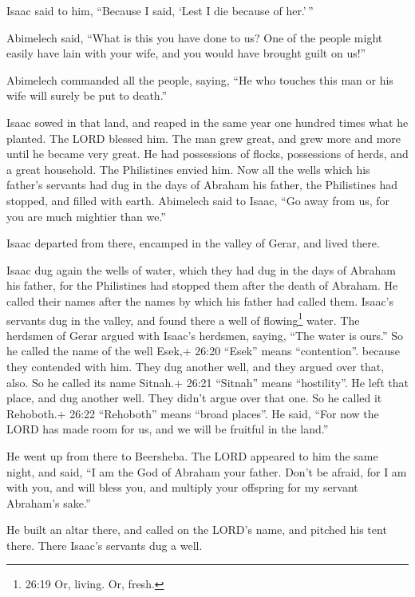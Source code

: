 Isaac said to him, ``Because I said, `Lest I die because of her.'\,''

 Abimelech said, ``What is this you have done to us? One of
the people might easily have lain with your wife, and you would have
brought guilt on us!''

 Abimelech commanded all the people, saying, ``He who
touches this man or his wife will surely be put to death.''

 Isaac sowed in that land, and reaped in the same year one
hundred times what he planted. The LORD blessed him.  The
man grew great, and grew more and more until he became very great.
 He had possessions of flocks, possessions of herds, and a
great household. The Philistines envied him.  Now all the
wells which his father's servants had dug in the days of Abraham his
father, the Philistines had stopped, and filled with earth.
 Abimelech said to Isaac, ``Go away from us, for you are
much mightier than we.''

 Isaac departed from there, encamped in the valley of
Gerar, and lived there.

 Isaac dug again the wells of water, which they had dug in
the days of Abraham his father, for the Philistines had stopped them
after the death of Abraham. He called their names after the names by
which his father had called them.  Isaac's servants dug in
the valley, and found there a well of flowing\footnote{26:19 Or, living.
  Or, fresh.} water.  The herdsmen of Gerar argued with
Isaac's herdsmen, saying, ``The water is ours.'' So he called the name
of the well Esek,+ 26:20 ``Esek'' means ``contention''. because they
contended with him.  They dug another well, and they argued
over that, also. So he called its name Sitnah.+ 26:21 ``Sitnah'' means
``hostility''.  He left that place, and dug another well.
They didn't argue over that one. So he called it Rehoboth.+ 26:22
``Rehoboth'' means ``broad places''. He said, ``For now the LORD has
made room for us, and we will be fruitful in the land.''

 He went up from there to Beersheba.  The LORD
appeared to him the same night, and said, ``I am the God of Abraham your
father. Don't be afraid, for I am with you, and will bless you, and
multiply your offspring for my servant Abraham's sake.''

 He built an altar there, and called on the LORD's name,
and pitched his tent there. There Isaac's servants dug a well.

